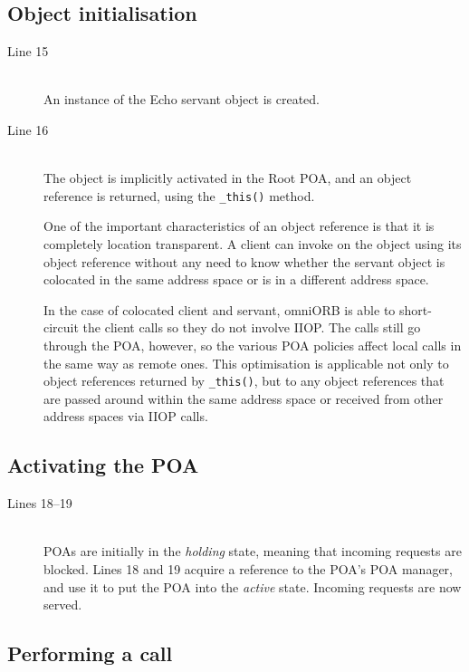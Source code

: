 \documentclass[11pt,twoside,a4paper]{book}
\newcommand{\op}[1]{\texttt{#1()}}
\newcommand{\term}[1]{\textit{#1}}
\begin{document}
\subsection{Object initialisation}

\begin{description}

\item[Line 15]\mbox{}\\
%
An instance of the Echo servant object is created.

\item[Line 16]\mbox{}\\
%
The object is implicitly activated in the Root POA, and an object
reference is returned, using the \op{\_this} method.

One of the important characteristics of an object reference is that it
is completely location transparent. A client can invoke on the object
using its object reference without any need to know whether the
servant object is colocated in the same address space or is in a
different address space.

In the case of colocated client and servant, omniORB is able to
short-circuit the client calls so they do not involve IIOP. The calls
still go through the POA, however, so the various POA policies affect
local calls in the same way as remote ones. This optimisation is
applicable not only to object references returned by \op{\_this}, but
to any object references that are passed around within the same
address space or received from other address spaces via IIOP calls.

\end{description}


\subsection{Activating the POA}

\begin{description}

\item[Lines 18--19]\mbox{}\\
%
POAs are initially in the \term{holding} state, meaning that incoming
requests are blocked. Lines 18 and 19 acquire a reference to the POA's
POA manager, and use it to put the POA into the \term{active} state.
Incoming requests are now served.

\end{description}


\subsection{Performing a call}
\end{document}

